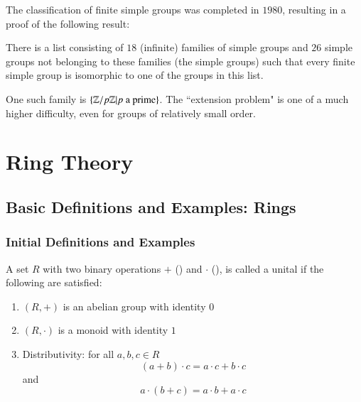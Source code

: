 \documentclass[12pt, a4paper, oneside, openright, titlepage]{book}
\begin{document}
The classification of finite simple groups was completed in $1980$, resulting in a proof of the following result:

\begin{thm}
    There is a list consisting of $18$ (infinite) families of simple groups and $26$ simple groups not belonging to these families (the  simple groups) such that every finite simple group is isomorphic to one of the groups in this list.
\end{thm}

One such family is $\{\mathbb Z/p\mathbb Z\vert p\text{ a prime}\}$. The ``extension problem" is one of a much higher difficulty, even for groups of relatively small order.





\part{Ring Theory}


\chapter{\textsection\textsection Basic Definitions and Examples: Rings}

\section{\textsection Initial Definitions and Examples}



\begin{defn}
    A set $R$ with two binary operations $+$ () and $\cdot$ (), is called a unital  if the following are satisfied:
    \begin{enumerate}
        \item $(R,+)$ is an abelian group with identity $0$
        \item $(R,\cdot)$ is a monoid with identity $1$
        \item Distributivity: for all $a,b,c \in R$ $$(a + b)\cdot c = a\cdot c + b\cdot c$$
        and $$a\cdot (b+c) = a\cdot b + a\cdot c$$
    \end{enumerate}
\end{defn}
\end{document}

